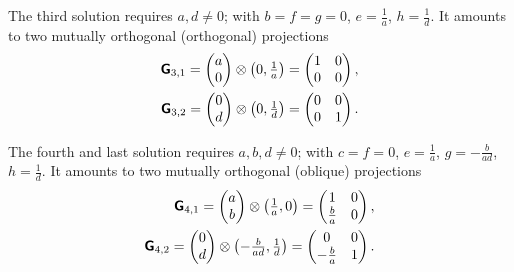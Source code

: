 {The third solution  requires $a,d\neq 0$; with
$b=f=g=0$,
$e=\frac{1}{a}$,
$h=\frac{1}{d}$.
It amounts to two mutually orthogonal (orthogonal) projections
\begin{equation}
\begin{split}
\textsf{\textbf{G}}_{3,1}=\begin{pmatrix}
a \\
0
\end{pmatrix}
\otimes
\begin{pmatrix}
0 ,  \frac{1}{a}
\end{pmatrix}
=
\begin{pmatrix}
1 & 0  \\
0 & 0
\end{pmatrix}
      ,
\\
\textsf{\textbf{G}}_{3,2}=
\begin{pmatrix}
0 \\
d
\end{pmatrix}
\otimes
\begin{pmatrix}
0,\frac{1}{d}
\end{pmatrix}
=
\begin{pmatrix}
0& 0 \\
0 & 1
\end{pmatrix}
      .
\end{split}
\end{equation}

The fourth and last solution  requires $a,b,d\neq 0$; with
$c=f=0$,
$e=\frac{1}{a}$,
$g=-\frac{b}{ad}$,
$h=\frac{1}{d}$.
It amounts to two  mutually orthogonal (oblique) projections
\begin{equation}
\begin{split}
\textsf{\textbf{G}}_{4,1}=\begin{pmatrix}
a \\
b
\end{pmatrix}
\otimes
\begin{pmatrix}
\frac{1}{a},0
\end{pmatrix}
=
\begin{pmatrix}
1 &  0\\
\frac{b}{a}& 0
\end{pmatrix}
      ,
\\
\textsf{\textbf{G}}_{4,2}=
\begin{pmatrix}
0 \\
d
\end{pmatrix}
\otimes
\begin{pmatrix}
- \frac{b}{ad},\frac{1}{d}
\end{pmatrix}
=
\begin{pmatrix}
0&  0 \\
-\frac{b}{a} & 1
\end{pmatrix}
      .
\end{split}
\end{equation}

\eexample
}



